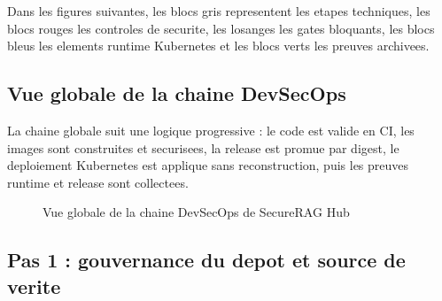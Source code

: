 Dans les figures suivantes, les blocs gris representent les etapes techniques,
les blocs rouges les controles de securite, les losanges les gates bloquants,
les blocs bleus les elements runtime Kubernetes et les blocs verts les preuves
archivees.

\subsection{Vue globale de la chaine DevSecOps}

La chaine globale suit une logique progressive : le code est valide en CI, les
images sont construites et securisees, la release est promue par digest, le
deploiement Kubernetes est applique sans reconstruction, puis les preuves
runtime et release sont collectees.

\begin{figure}[htbp]
\centering
{}
\caption{Vue globale de la chaine DevSecOps de SecureRAG Hub}
\label{fig:devsecops-global}
\end{figure}

\subsection{Pas 1 : gouvernance du depot et source de verite}

